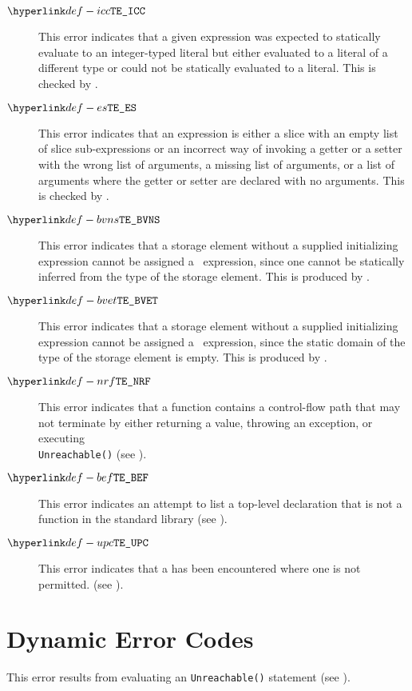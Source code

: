 \begin{description}
\hypertarget{def-icc}{}
\item[$\IntConstantExpected$]
This error indicates that a given expression was expected to statically evaluate
to an integer-typed literal but either evaluated to a literal of a different type
or could not be statically evaluated to a literal.
This is checked by .

\hypertarget{def-es}{}
\item[$\EmptySlice$]
This error indicates that an expression is either a slice with an empty list of slice sub-expressions
or an incorrect way of invoking a getter or a setter with the wrong list of arguments, a missing
list of arguments, or a list of arguments where the getter or setter are declared with no arguments.
This is checked by .

\hypertarget{def-bvns}{}
\item[$\BaseValueNonStatic$]
This error indicates that a storage element without a supplied initializing expression cannot be
assigned a \basevalueterm\ expression, since one cannot be statically inferred from the type of the
storage element.
This is produced by .

\hypertarget{def-bvet}{}
\item[$\BaseValueEmptyType$]
This error indicates that a storage element without a supplied initializing expression cannot be
assigned a \basevalueterm\ expression, since the static domain of the type of the storage element
is empty.
This is produced by .

\hypertarget{def-nrf}{}
\item[$\NonReturningFunction$]
This error indicates that a function contains a control-flow path that may not terminate by
either returning a value, throwing an exception, or executing \\
\texttt{Unreachable()} (see ).

\hypertarget{def-bef}{}
\item[$\BuiltinExpectedToBeFunction$]
This error indicates an attempt to list a top-level declaration that is not a function
in the standard library
(see ).

\hypertarget{def-upc}{}
\item[$\UnexpectedPendingConstrained$]
This error indicates that a \pendingconstrainedintegertype{} has been encountered where one is not permitted.
(see ).

\end{description}

\section{Dynamic Error Codes}
\begin{description}
\hypertarget{def-unr}{}
\item[$\UnreachableError$]
This error results from evaluating an \texttt{Unreachable()} statement (see ).
\end{description}
